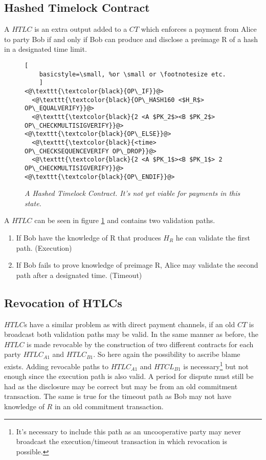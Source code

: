 \subsection{Hashed Timelock Contract}

A $HTLC$ is an extra output added to a $CT$ which enforces a payment from Alice to party Bob if and only if Bob can produce and disclose a preimage R of a hash in a designated time limit. 

\begin{figure}[hbt!]
	\centering
	\begin{lstlisting}[
	basicstyle=\small, %or \small or \footnotesize etc.
	]
<@\texttt{\textcolor{black}{OP\_IF}}@>
  <@\texttt{\textcolor{black}{OP\_HASH160 <$H_R$> OP\_EQUALVERIFY}}@>
  <@\texttt{\textcolor{black}{2 <A $PK_2$><B $PK_2$> OP\_CHECKMULTISIGVERIFY}}@>  
<@\texttt{\textcolor{black}{OP\_ELSE}}@>
  <@\texttt{\textcolor{black}{<time> OP\_CHECKSEQUENCEVERIFY OP\_DROP}}@>
  <@\texttt{\textcolor{black}{2 <A $PK_1$><B $PK_1$> 2 OP\_CHECKMULTISIGVERIFY}}@>
<@\texttt{\textcolor{black}{OP\_ENDIF}}@>
	\end{lstlisting}
	
	\caption{\textit{ A Hashed Timelock Contract. It's not yet viable for payments in this state.
	}}
	\label{fig:HTLC}
\end{figure}

A $HTLC$ can be seen in figure \ref{fig:HTLC} and contains two validation paths. 

\begin{enumerate}
	\item If Bob have the knowledge of R that produces $H_{R}$ he can validate the first path. (Execution)
	\item If Bob fails to prove knowledge of preimage R, Alice may validate the second path after a designated time. (Timeout)
\end{enumerate}

\subsection{Revocation of HTLCs}

$HTLC$s have a similar problem as with direct payment channels, if an old $CT$ is broadcast both validation paths may be valid. In the same manner as before, the $HTLC$ is made revocable by the construction of two different contracts for each party $HTLC_{A1}$ and $HTLC_{B1}$. So here again the possibility to ascribe blame exists. Adding revocable paths to $HTLC_{A1}$ and $HTCL_{B1}$ is necessary\footnote{It's necessary to include this path as an uncooperative party may never broadcast the execution/timeout transaction in which revocation is possible.} but not enough since the execution path is also valid. A period for dispute must still be had as the disclosure may be correct but may be from an old commitment transaction. The same is true for the timeout path as Bob may not have knowledge of $R$ in an old commitment transaction.   


